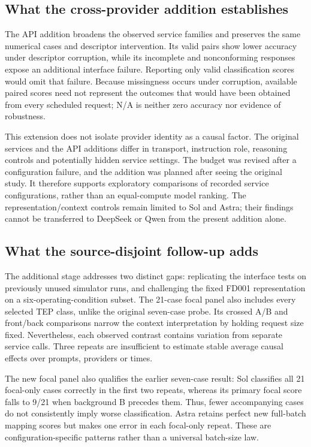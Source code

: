 \documentclass[11pt,a4paper]{article}
\begin{document}
\subsection{What the cross-provider addition establishes}
The API addition broadens the observed service families and preserves the same numerical cases and descriptor intervention. Its valid pairs show lower accuracy under descriptor corruption, while its incomplete and nonconforming responses expose an additional interface failure. Reporting only valid classification scores would omit that failure. Because missingness occurs under corruption, available paired scores need not represent the outcomes that would have been obtained from every scheduled request; N/A is neither zero accuracy nor evidence of robustness.

This extension does not isolate provider identity as a causal factor. The original services and the API additions differ in transport, instruction role, reasoning controls and potentially hidden service settings. The budget was revised after a configuration failure, and the addition was planned after seeing the original study. It therefore supports exploratory comparisons of recorded service configurations, rather than an equal-compute model ranking. The representation/context controls remain limited to Sol and Astra; their findings cannot be transferred to DeepSeek or Qwen from the present addition alone.

\subsection{What the source-disjoint follow-up adds}
The additional stage addresses two distinct gaps: replicating the interface tests on previously unused simulator runs, and challenging the fixed FD001 representation on a six-operating-condition subset. The 21-case focal panel also includes every selected TEP class, unlike the original seven-case probe. Its crossed A/B and front/back comparisons narrow the context interpretation by holding request size fixed. Nevertheless, each observed contrast contains variation from separate service calls. Three repeats are insufficient to estimate stable average causal effects over prompts, providers or times.

The new focal panel also qualifies the earlier seven-case result: Sol classifies all 21 focal-only cases correctly in the first two repeats, whereas its primary focal score falls to 9/21 when background B precedes them. Thus, fewer accompanying cases do not consistently imply worse classification. Astra retains perfect new full-batch mapping scores but makes one error in each focal-only repeat. These are configuration-specific patterns rather than a universal batch-size law.
\end{document}
